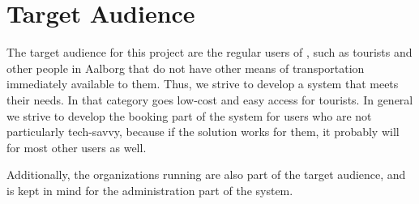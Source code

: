 \section{Target Audience}
The target audience for this project are the regular users of \bycykelwithoutspace, such as tourists and other people in Aalborg that do not have other means of transportation immediately available to them. 
Thus, we strive to develop a system that meets their needs.
In that category goes low-cost and easy access for tourists.
In general we strive to develop the booking part of the system for users who are not particularly tech-savvy, because if the solution works for them, it probably will for most other users as well.

Additionally, the organizations running \bycykel are also part of the target audience, and is kept in mind for the administration part of the system.